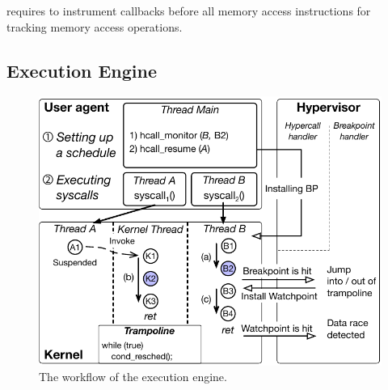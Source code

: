 \sys requires to instrument callbacks before all memory access
instructions for tracking memory access operations.
%



\subsection{Execution Engine}
\label{ss:engine}

\begin{figure}
  \includegraphics[width=0.9\linewidth]{fig/workflow-hypervisor.pdf}
  \caption{The workflow of the execution engine. }
  \label{fig:workflow-hypervisor}
\end{figure}

